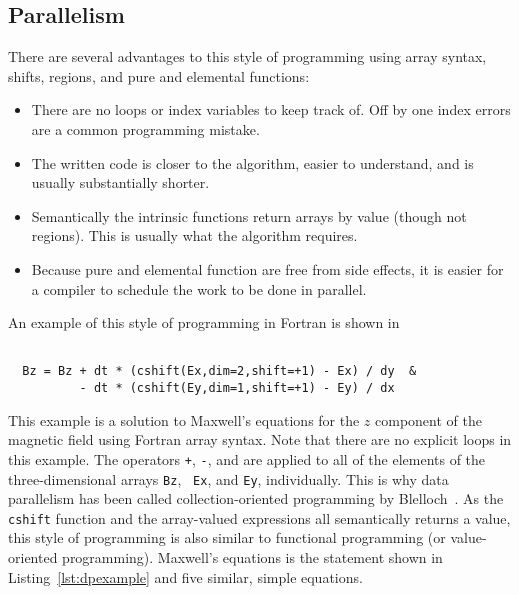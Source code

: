 \subsection{Parallelism}





There are several advantages to this style of programming using array syntax, shifts, regions,
and pure and elemental functions:

\begin{itemize}
	\item There are no loops or index variables to keep track of.  Off by one
index errors are a common programming mistake.
        \item The written code is closer to the algorithm, easier to understand, and is usually substantially shorter.
	\item Semantically the intrinsic functions return arrays by value (though not regions).  This is usually what the algorithm requires.
	\item Because pure and elemental function are free from side effects, it is easier for a compiler to schedule the work to be done in parallel.
\end{itemize}

An example of this style of programming in Fortran is shown in

\begin{verbatim}

  Bz = Bz + dt * (cshift(Ex,dim=2,shift=+1) - Ex) / dy  &
          - dt * (cshift(Ey,dim=1,shift=+1) - Ey) / dx

\end{verbatim}

This example is a solution to Maxwell's equations for the $z$ component of the
magnetic field using Fortran array syntax.  Note that there are no explicit
loops in this example.  The operators {\tt +}, {\tt -}, and {\tt *} are
applied to all of the elements of the three-dimensional arrays {\tt Bz}, {\tt
  Ex}, and {\tt Ey}, individually.  This is why data parallelism has been
called collection-oriented programming by
Blelloch~\cite{blelloch90,rajopadhyedidlacs}.  As the {\tt cshift} function
and the array-valued expressions all semantically returns a value, this style
of programming is also similar to functional programming (or value-oriented
programming). %
Maxwell's equations is the statement shown in Listing~\ref{lst:dpexample} and
five similar, simple equations.

